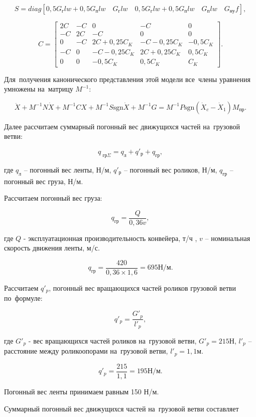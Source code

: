 $$ S = diag [ 0,5 G_{\text{г}} l w + 0,5 G_{\text{п}} l w \quad G_{\text{г}} l w \quad 0,5 G_{\text{г}} l w + 0,5 G_{\text{п}} l w \quad G_{\text{п}} l w \quad G_{\text{ну}} f], $$

$$ 
C = 
\begin{bmatrix}
	2C & -C & 0             & -C            & 0         \\
	-C & 2C & -C            & 0             & 0         \\
	0  & -C & 2C + 0,25C_K  & -C - 0,25 C_K & -0,5 C_K  \\
	-C & 0  & -C - 0,25 C_K & 2C + 0,25C_K  & 0,5 C_K   \\
	0  & 0  & -0,5 C_K      & 0,5 C_K       & C_K
\end{bmatrix}.
$$

Для~получения канонического представления этой модели все~члены уравнения умножены на~матрицу $ M^{-1} $:

$$ \ddot X + M^{-1} N \dot X + M^{-1} C X + M^{-1} S \text{sgn} \dot X + M^{-1} G = M^{-1} P \text{sgn} ( \dot X_c - \dot X_1 ) M_{\text{пр}}. $$

Далее рассчитаем суммарный погонный вес движущихся частей на~грузовой ветви: 

$$ q_{\text{ гр} \Sigma} = q_{\text{л}} + q'_{\text{р}} + q_{\text{гр}}, $$

где $ q_{\text{л}} $ – погонный вес ленты, Н/м, $ q'_{\text{р}} $  – погонный вес роликов, Н/м, $ q_{\text{гр}} $ – погонный вес груза, Н/м.

Рассчитаем погонный вес груза: 

$$ q_{\text{гр}} = \frac{Q}{0,36 v}, $$

где $Q$ - эксплуатационная производительность конвейера, т/ч , $v$ – номинальная скорость движения ленты, м/с.

$$ q_{\text{гр}} = \frac{420}{0,36 \times 1,6} = 695 \text{Н/м}. $$

Рассчитаем $ q'_p $, погонный вес вращающихся частей роликов грузовой ветви по~формуле: 

$$ q'_p = \frac{G'_p}{l'_p}, $$

где $ G'_p $ - вес вращающихся частей роликов на~грузовой ветви, $ G'_p = 215 \text{Н} $, $ l'_p $ – расстояние между роликоопорами на~грузовой ветви, $ l'_p = 1,1 \text{м}. $

$$ q'_p = \frac{215}{1,1} = 195 \text{Н/м}. $$

Погонный вес ленты принимаем равным 150 Н/м.

Суммарный погонный вес движущихся частей на~грузовой ветви составляет

